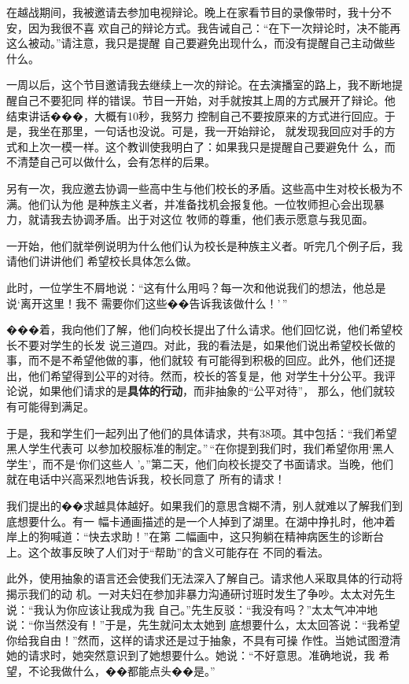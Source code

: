 \documentclass{ctexart}
\begin{document}
在越战期间，我被邀请去参加电视辩论。晚上在家看节目的录像带时，我十分不安，因为我很不喜
欢自己的辩论方式。我告诫自己：``在下一次辩论时，决不能再这么被动。''请注意，我只是提醒
自己要避免出现什么，而没有提醒自己主动做些什么。

一周以后，这个节目邀请我去继续上一次的辩论。在去演播室的路上，我不断地提醒自己不要犯同
样的错误。节目一开始，对手就按其上周的方式展开了辩论。他结束讲话���，大概有10秒，我努力
控制自己不要按原来的方式进行回应。于是，我坐在那里，一句话也没说。可是，我一开始辩论，
就发现我回应对手的方式和上次一模一样。这个教训使我明白了：如果我只是提醒自己要避免什
么，而不清楚自己可以做什么，会有怎样的后果。

另有一次，我应邀去协调一些高中生与他们校长的矛盾。这些高中生对校长极为不满。他们认为他
是种族主义者，并准备找机会报复他。一位牧师担心会出现暴力，就请我去协调矛盾。出于对这位
牧师的尊重，他们表示愿意与我见面。

一开始，他们就举例说明为什么他们认为校长是种族主义者。听完几个例子后，我请他们讲讲他们
希望校长具体怎么做。

此时，一位学生不屑地说：``这有什么用吗？每一次和他说我们的想法，他总是说`离开这里！我不
需要你们这些��告诉我该做什么！'\,''

���着，我向他们了解，他们向校长提出了什么请求。他们回忆说，他们希望校长不要对学生的长发
说三道四。对此，我的看法是，如果他们说出希望校长做的事，而不是不希望他做的事，他们就较
有可能得到积极的回应。此外，他们还提出，他们希望得到公平的对待。然而，校长的答复是，他
对学生十分公平。我评论说，如果他们请求的是\textbf{具体的行动}，而非抽象的``公平对待''，
那么，他们就较有可能得到满足。

于是，我和学生们一起列出了他们的具体请求，共有38项。其中包括：``我们希望黑人学生代表可
以参加校服标准的制定。''\,``在你提到我们时，我们希望你用`黑人学生'，而不是`你们这些人
'。''第二天，他们向校长提交了书面请求。当晚，他们就在电话中兴高采烈地告诉我，校长同意了
所有的请求！

我们提出的��求越具体越好。如果我们的意思含糊不清，别人就难以了解我们到底想要什么。有一
幅卡通画描述的是一个人掉到了湖里。在湖中挣扎时，他冲着岸上的狗喊道：``快去求助！''在第
二幅画中，这只狗躺在精神病医生的诊断台上。这个故事反映了人们对于``帮助''的含义可能存在
不同的看法。

此外，使用抽象的语言还会使我们无法深入了解自己。请求他人采取具体的行动将揭示我们的动
机。一对夫妇在参加非暴力沟通研讨班时发生了争吵。太太对先生说：``我认为你应该让我成为我
自己。''先生反驳：``我没有吗？''太太气冲冲地说：``你当然没有！''于是，先生就问太太她到
底想要什么，太太回答说：``我希望你给我自由！''然而，这样的请求还是过于抽象，不具有可操
作性。当她试图澄清她的请求时，她突然意识到了她想要什么。她说：``不好意思。准确地说，我
希望，不论我做什么，��都能点头��是。''
\end{document}
